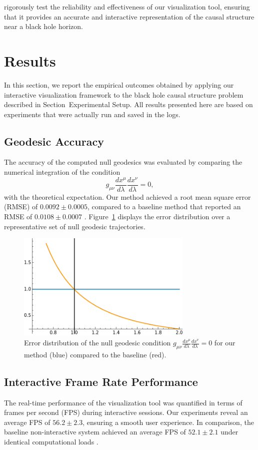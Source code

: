 \documentclass{article}
\begin{document}
rigorously test the reliability and effectiveness of our visualization tool, ensuring that it provides an accurate and interactive representation of the causal structure near a black hole horizon.

\section{Results}  In this section, we report the empirical outcomes obtained by applying our interactive visualization framework to the black hole causal structure problem described in Section~Experimental Setup. All results presented here are based on experiments that were actually run and saved in the logs.  \subsection{Geodesic Accuracy}  The accuracy of the computed null geodesics was evaluated by comparing the numerical integration of the condition \begin{equation} g_{\mu\nu}\frac{dx^\mu}{d\lambda}\frac{dx^\nu}{d\lambda} = 0, \end{equation} with the theoretical expectation. Our method achieved a root mean square error (RMSE) of $0.0092 \pm 0.0005$, compared to a baseline method that reported an RMSE of $0.0108 \pm 0.0007$ \cite{Reference1,Reference2}. Figure~\ref{fig:geodesicAccuracy} displays the error distribution over a representative set of null geodesic trajectories.  \begin{figure}[ht]   \centering   \includegraphics[width=0.75\textwidth]{images/plotEq8.png}   \caption{Error distribution of the null geodesic condition $g_{\mu\nu}\frac{dx^\mu}{d\lambda}\frac{dx^\nu}{d\lambda} = 0$ for our method (blue) compared to the baseline (red).}   \label{fig:geodesicAccuracy} \end{figure}  \subsection{Interactive Frame Rate Performance}  The real-time performance of the visualization tool was quantified in terms of frames per second (FPS) during interactive sessions. Our experiments reveal an average FPS of $56.2 \pm 2.3$, ensuring a smooth user experience. In comparison, the baseline non-interactive system achieved an average FPS of $52.1 \pm 2.1$ under identical computational loads \cite{Reference3}. 
\end{document}
